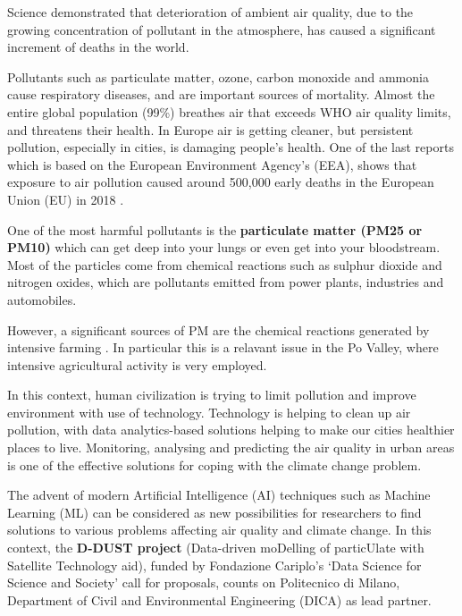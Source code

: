 Science demonstrated that deterioration of ambient air quality, due to the growing concentration of pollutant in the atmosphere, has caused a significant increment of deaths in the world.\par  
Pollutants such as particulate matter, ozone, carbon monoxide and ammonia cause respiratory diseases, and are important sources of mortality.
Almost the entire global population (99\%) breathes air that exceeds WHO air quality limits, and threatens their health.\newline
In Europe air is getting cleaner, but persistent pollution, especially in cities, is damaging people’s health. One of the last reports which is based on the European Environment Agency’s (EEA), shows that exposure to air pollution caused around 500,000 early deaths in the European Union (EU) in 2018 \cite{european2018air}.\par
One of the most harmful pollutants is the \textbf{particulate matter (PM25 or PM10)} which can get deep into your lungs or even get into your bloodstream.\newline
Most of the particles come from chemical reactions such as sulphur dioxide and nitrogen oxides, which are pollutants emitted from power plants, industries and automobiles.\par
However, a significant sources of PM are the chemical reactions generated by intensive farming \cite{burkart2007diffuse}.
In particular this is a relavant issue in the Po Valley, where intensive agricultural activity is very employed.\par
In this context, human civilization is trying to limit pollution and improve environment with use of technology.\newline
Technology is helping to clean up air pollution, with data analytics-based solutions helping to make our cities healthier places to live.\newline
Monitoring, analysing and predicting the air quality in urban areas is one of the effective solutions for coping with the climate change problem.\par
The advent of modern Artificial Intelligence (AI) techniques such as Machine Learning (ML) can be considered as new possibilities for researchers to find solutions to various problems affecting air quality and climate change.
\bigskip
In this context, the \textbf{D-DUST project} (Data-driven moDelling of particUlate with Satellite Technology aid), funded by Fondazione Cariplo’s ‘Data Science for Science and Society’ call for proposals, counts on Politecnico di Milano, Department of Civil and Environmental Engineering (DICA) as lead partner.\newline
